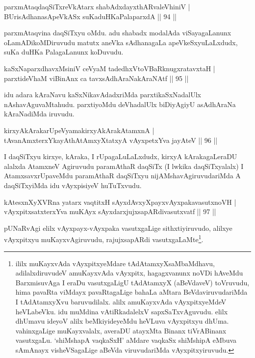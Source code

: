 
\begin{shl}
parxmAtaqdaqSiTxreVkA\s tarx shabAdxdayxthARvaleVhiniV |\\
BUrisAdhanasApeVkASx suKaduHKaPalaparxdA \hfill || 94 ||
\end{shl}

\begin{artha}
parxmAtaqvina daqSiTxyu oMdu. adu shabadx modalAda viSayagaLanunx oLamADikoMDiruvudu matutx aneVka sAdhanagaLa apeVkeSxyuLaLxdudx, suKa duHKa PalagaLanunx koDuvudu.
\end{artha}

\begin{shl}
kaSxNaparxdhavxMsiniV ceVyaM tadedhxVtoVBaRknugxratavxtaH |\\
parxtideVhaM viBinAnx ca tavxsAdhAraNakAraNAtf \hfill || 95 ||
\end{shl}

\begin{artha}
idu adara kAraNavu kaSxNikavAdadxriMda parxtikaSxNadalUlx nAshavAguvaMtahudu. parxtiyoMdu deVhadalUlx biDiyAgiyU asAdhAraNa kAraNadiMda iruvudu.
\end{artha}%

\begin{shl}
kirxyAkArakarUpeVyamakirxyA\s kArakAtamxnA |\\
tAvanAmxterxYkayAthAtAmxyXtatxyA vAyxpetxYva jayAteV \hfill || 96 ||
\end{shl}

\begin{artha}
I daqSiTxyu kirxye, kAraka, I rUpagaLuLaLxdudx, kirxyA kArakagaLeraDU alalxda AtamxneV Agiruvudu paramAthaR daqSiTx (I lwkika daqSiTxyalalx) I AtamxsavxrUpaveMdu paramAthaR daqSiTxyu nijAMshavAgiruvudariMda A daqSiTxyiMda idu vAyxpisiyeV huTuTxvudu.
\end{artha}


\begin{shl}
kAtesxnXyXVRna yatarx vaqtitxH sAyxdAvxyXpayxvAyxpakavasutxnoVH |\\
vAyxpitxsatxterxYva muKAyx sAyxdarxjujxsapARdivasutxvatf \hfill || 97 ||
\end{shl}

\begin{artha}
pUNaRvAgi elilx vAyxpayx-vAyxpaka vasutxgaLige sithxtiyiruvudo, alilxye vAyxpitxyu muKayxvAgiruvudu, rajujxsapARdi vasutxgaLaMte\footnote{ililx muKayxvAda vAyxpitxyeMdare tAdAtamxyXsaMbaMdhavu, adilalxdiruvudeV amuKayxvAda vAyxpitx, hagagxvanunx noVDi hAveMdu BarxmisuvAga I eraDu vasutxgaLigU tAdAtamxyX (aBeVdaveV) toVruvudu, hima pavaRta viMdayx pavaRtagaLige bahaLa aMtara BeVdaviruvudariMda I tAdAtamxyXvu baruvudilalx. alilx amuKayxvAda vAyxpitxyeMdeV heVLabeVku. idu muMdina vAtiRkadalelxV sapxSaTxvAguvudu. elilx dhUmavu ideyoV alilx beMkiyideyeMdu heVLuva vAyxpitxyu dhUma. vahinxgaLige muKayxvalalx, averaDU atayxMta Binanx tiVrABinanx vasutxgaLu. `shiMshapA vaqkaSxH' aMdare vaqkaSx shiMshipA eMbuva sAmAnayx visheVSagaLige aBeVda viruvudariMda vAyxpitxyiruvudu.}.
\end{artha}

